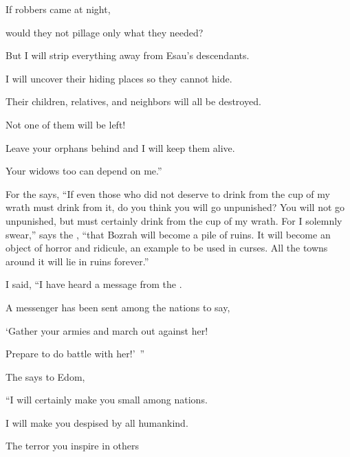{\par }{\Q If
robbers
came at night,
\par }{\Q would they not pillage
only what they needed?
\par }{\Q {}But
I
will strip
everything away
from Esau’s
descendants.
\par }{\Q I will uncover
their hiding places
so they cannot
hide.
\par }{\Q Their children,
relatives,
and neighbors
will all be
destroyed.
\par }{\Q Not one of them will be left!
\par }{\Q {}Leave
your orphans
behind and I
will keep them alive.
\par }{\Q Your widows
too can depend
on me.”
\par }{\PP {}For
the {}
says,
“If
even those who
did not
deserve
to drink
from the cup
of my wrath must
drink
from it,
do you think you
will go unpunished? You will not
go unpunished,
but must certainly
drink from the cup of my wrath.
For
I solemnly swear,”
says
the {}, “that
Bozrah
will become a pile of ruins.
It will become an object of horror
and ridicule,
an example to be
used in curses.
All
the towns
around it will lie
in ruins
forever.”
\par }{\Q {}I said, “I have heard
a message
from the
{}.
\par }{\Q A messenger
has been sent
among the nations
to say,
\par }{\Q ‘Gather
your armies and march out
against
her!
\par }{\Q Prepare to do
battle with her!’ ”
\par }{\Q {}The
{} says to Edom,

\par }{\Q “I
will certainly
make you small
among nations.
\par }{\Q I will make you despised
by all humankind.
\par }{\Q {}The terror
you inspire in others

}
